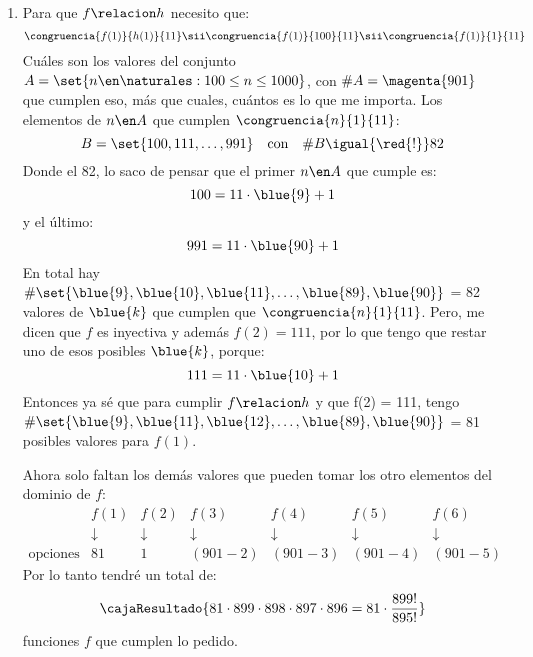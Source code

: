 \begin{enumerate}[label=\alph*)]
  \item
        Para que $f \relacion h$ necesito que:
        $$
          \congruencia{f(1)}{h(1)}{11}
          \sii
          \congruencia{f(1)}{100}{11}
          \sii
          \congruencia{f(1)}{1}{11}
        $$
        Cuáles son los valores del conjunto $A = \set{n \en \naturales :  100 \leq n \leq 1000}$, con $\#A = \magenta{901}$ que cumplen eso, más que cuales,
        cuántos es lo que me importa. Los elementos de $n \en A$ que cumplen $\congruencia{n}{1}{11}$:
        $$
          B = \set{100, 111, \dots, 991} \quad\text{con} \quad \#B \igual{\red{!}} 82
        $$
        Donde el 82, lo saco de pensar que el primer $n \en A$ que cumple es:
        $$
          100 = 11 \cdot \blue{9} + 1
        $$
        y el último:
        $$
          991 = 11 \cdot \blue{90} + 1
        $$
        En total hay $\#\set{\blue{9},\blue{10},\blue{11},\dots,\blue{89},\blue{90}}$ = 82 valores de $\blue{k}$ que cumplen que $\congruencia{n}{1}{11}$. Pero, me dicen que $f$ es inyectiva y además
        $f(2) = 111$, por lo que tengo que restar uno de esos posibles $\blue{k}$, porque:
        $$
          111 = 11 \cdot \blue{10} + 1
        $$
        Entonces ya sé que para cumplir $f \relacion h$ y que f(2) = 111, tengo $\#\set{\blue{9},\blue{11}, \blue{12},\dots,\blue{89},\blue{90}}$ = 81
        posibles valores para $f(1)$.

        Ahora solo
        faltan los demás valores que pueden tomar los otro elementos del dominio de $f$:
        $$
          \begin{array}{ccccccc}
                            & f(1)       & f(2)       & f(3)       & f(4)       & f(5)       & f(6)       \\
                            & \downarrow & \downarrow & \downarrow & \downarrow & \downarrow & \downarrow \\
            \text{opciones} & 81         & 1          & (901 - 2)  & (901 - 3)  & (901 - 4)  & (901 - 5)
          \end{array}
        $$
        Por lo tanto tendré un total de:
        $$
          \cajaResultado{
            81 \cdot 899 \cdot 898 \cdot 897 \cdot 896 =  81 \cdot \frac{899!}{895!}
          }
        $$
        funciones $f$ que cumplen lo pedido.
\end{enumerate}

\begin{aportes}
  \item {}
\end{aportes}
